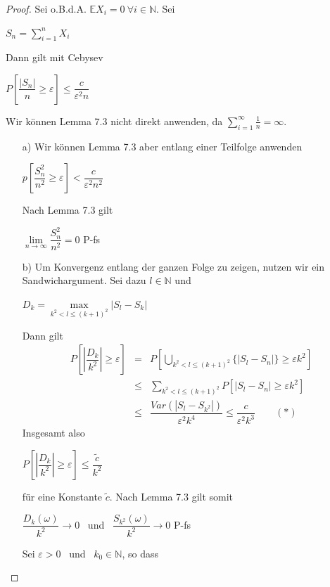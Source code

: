 \documentclass[10pt,a4paper]{report}
\newcommand{\E}{\mathbb{E}}
\newcommand{\N}{\mathbb{N}}
\numberwithin{equation}{section}
\numberwithin{figure}{section}
\theoremstyle{plain}
\theoremstyle{definition}
\theoremstyle{remark}
\theoremstyle{plain}
\newcommand{\1}{ \mathbb{1} } %
\begin{document}
\begin{proof}
  Sei o.B.d.A. $\E X_i=0 ~ \forall i \in \mathbb{N}$. Sei
  \begin{center}
    $S_n=\sum\limits_{i=1}^nX_i$
  \end{center}
  Dann gilt mit Cebysev
  \begin{center}
    $P\left[\dfrac{|S_n|}{n}\geq \varepsilon\right]\leq
    \dfrac{c}{\varepsilon^2n}$
  \end{center}
  Wir können Lemma 7.3 nicht direkt anwenden, da
  $\sum\limits_{i=1}^\infty \frac{1}{n}=\infty$.
  \begin{itemize}
  \item[a)] Wir können Lemma 7.3 aber entlang einer Teilfolge anwenden
    \begin{center}
      $p\left[\dfrac{S_n^2}{n^2}\geq
        \varepsilon\right]<\dfrac{c}{\varepsilon^2n^2}$
    \end{center}
    Nach Lemma 7.3 gilt
    \begin{center}
      $\lim\limits_{n \to \infty} \dfrac{S_n^2}{n^2}=0$ P-fs
    \end{center}
  \item[b)] Um Konvergenz entlang der ganzen Folge zu zeigen, nutzen
    wir ein Sandwichargument. Sei dazu $l \in \N$ und
    \begin{center}
      $D_k=\max\limits_{k^2<l\leq (k+1)^2} |S_l-S_k|$
    \end{center}
    Dann gilt
    \begin{eqnarray*}
      P\left[\left|\dfrac{D_k}{k^2}\right|\geq \varepsilon\right]&=&P\left[\bigcup\limits_{k^2<l\leq (k+1)^2}\{|S_l-S_n|\}\geq \varepsilon k^2\right]\\
      &\leq & \sum\limits_{k^2<l\leq (k+1)^2}P[|S_l-S_n|\geq \varepsilon k^2]\\
      &\leq & \dfrac{Var(|S_l-S_{k^2}|)}{\varepsilon^2 k^4}\leq \dfrac{c}{\varepsilon^2 k^3}\qquad (*)
    \end{eqnarray*}
    Insgesamt also
    \begin{center}
      $P\left[\left|\dfrac{D_k}{k^2}\right|\geq \varepsilon \right]\leq
      \dfrac{\tilde{c}}{k^2}$
    \end{center}
    für eine Konstante $\tilde{c}$. Nach Lemma 7.3 gilt somit
    \begin{center}
      $\dfrac{D_k(\omega)}{k^2} \to 0$ ~und~
      $\dfrac{S_{k^2}(\omega)}{k^2} \to 0$ P-fs
    \end{center}
    Sei $\varepsilon > 0$ ~und~ $k_0 \in \N$, so dass

\end{itemize}
\end{proof}
\end{document}
